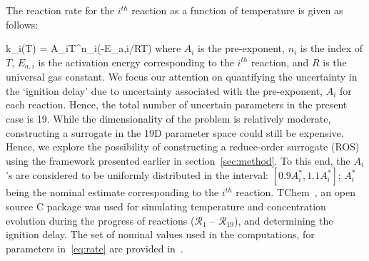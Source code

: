 The reaction rate for the $i^{th}$ reaction as a function of temperature
is given as follows:

\be
k_i(T) = A_iT^{n_i}\exp(-E_{a,i}/RT) 
\label{eq:rate}
\ee
%
where $A_i$ is the pre-exponent, $n_i$ is the index of $T$, $E_{a,i}$
is the activation energy corresponding to the $i^{th}$ reaction, and
$R$ is the universal gas constant. We focus our attention on 
quantifying the uncertainty in the `ignition delay' due to uncertainty
associated with the pre-exponent, $A_i$ for each reaction. Hence, the
total number of uncertain parameters in the present case is 19. 
While the dimensionality of the problem is relatively moderate,
constructing a surrogate in the 19D parameter space could still be
expensive. Hence, we explore the possibility of constructing a
reduce-order surrogate (ROS) using the framework presented earlier
in section~\ref{sec:method}. To this end, the $A_i$'s are considered
to be uniformly distributed in the interval: $[0.9A_i^\ast, 1.1A_i^\ast]$;
$A_i^\ast$ being the nominal estimate corresponding to the $i^{th}$
reaction. TChem~\cite{Safta:2011}, an open source C package was used
for simulating temperature and concentration evolution during the
progress of reactions ($\mathcal{R}_1$ -- $\mathcal{R}_{19}$), and determining
the ignition delay. The set of nominal values used in the computations,
for parameters in~\eqref{eq:rate} are provided in~\cite{Yetter:1991}. 

